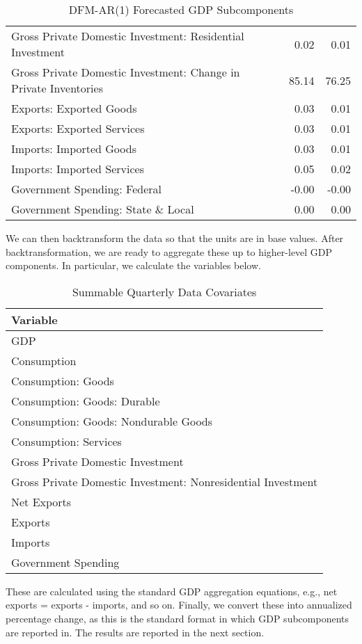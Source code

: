 \documentclass[11pt, letterpaper]{article}\usepackage[]{graphicx}\usepackage[]{color}
\begin{document}
\begin{table}[H]
\begin{tabular}{lrr}
  Gross Private Domestic Investment: Residential Investment & 0.02 & 0.01 \\ 
  Gross Private Domestic Investment: Change in Private Inventories & 85.14 & 76.25 \\ 
  Exports: Exported Goods & 0.03 & 0.01 \\ 
  Exports: Exported Services & 0.03 & 0.01 \\ 
  Imports: Imported Goods & 0.03 & 0.01 \\ 
  Imports: Imported Services & 0.05 & 0.02 \\ 
  Government Spending: Federal & -0.00 & -0.00 \\ 
  Government Spending: State \& Local & 0.00 & 0.00 \\ 
   \hline
\end{tabular}
\endgroup
\caption{DFM-AR(1) Forecasted GDP Subcomponents} 
\end{table}


We can then backtransform the data so that the units are in base values. After backtransformation, we are ready to aggregate these up to higher-level GDP components. In particular, we calculate the variables below.
\begin{table}[H]
\centering
\begingroup\scriptsize
\begin{tabular}{l}
  \hline
Variable \\ 
  \hline
GDP \\ 
  Consumption \\ 
  Consumption: Goods \\ 
  Consumption: Goods: Durable \\ 
  Consumption: Goods: Nondurable Goods \\ 
  Consumption: Services \\ 
  Gross Private Domestic Investment \\ 
  Gross Private Domestic Investment: Nonresidential Investment \\ 
  Net Exports \\ 
  Exports \\ 
  Imports \\ 
  Government Spending \\ 
   \hline
\end{tabular}
\endgroup
\caption{Summable Quarterly Data Covariates} 
\end{table}

These are calculated using the standard GDP aggregation equations, e.g., net exports = exports - imports, and so on.
Finally, we convert these into annualized percentage change, as this is the standard format in which GDP subcomponents are reported in. The results are reported in the next section.
\end{document}
